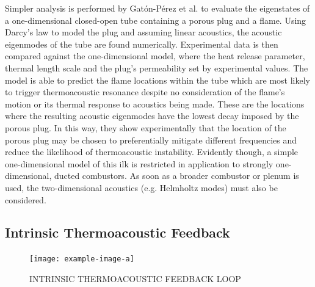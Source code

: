 Simpler analysis is performed by Gatón-Pérez et al. \cite{gaton-perez2025MitigationThermoacousticInstabilities} to evaluate the eigenstates of a one-dimensional closed-open tube containing a porous plug and a flame. Using Darcy's law to model the plug and assuming linear acoustics, the acoustic eigenmodes of the tube are found numerically. Experimental data is then compared against the one-dimensional model, where the heat release parameter, thermal length scale and the plug's permeability set by experimental values. The model is able to predict the flame locations within the tube which are most likely to trigger thermoacoustic resonance despite no consideration of the flame's motion or its thermal response to acoustics being made. These are the locations where the resulting acoustic eigenmodes have the lowest decay imposed by the porous plug. In this way, they show experimentally that the location of the porous plug may be chosen to preferentially mitigate different frequencies and reduce the likelihood of thermoacoustic instability. Evidently though, a simple one-dimensional model of this ilk is restricted in application to strongly one-dimensional, ducted combustors. As soon as a broader combustor or plenum is used, the two-dimensional acoustics (e.g. Helmholtz modes) must also be considered.







\subsection{Intrinsic Thermoacoustic Feedback}

\begin{figure}[t]
\centering
\texttt{[image: example-image-a]}
\caption{INTRINSIC THERMOACOUSTIC FEEDBACK LOOP}
\label{fig:ita-loop}
\end{figure}



